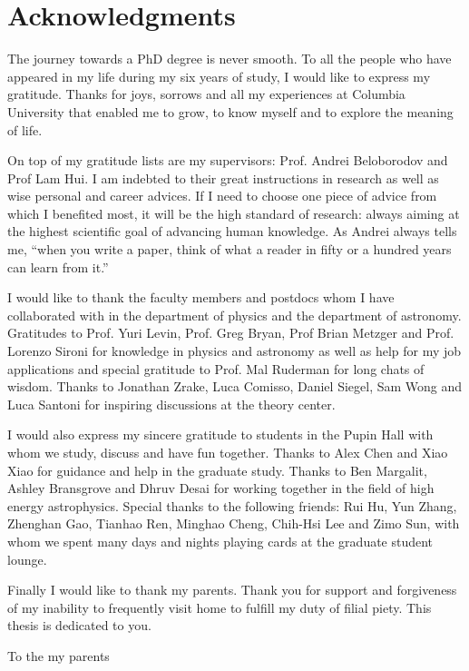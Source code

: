 \chapter*{Acknowledgments}
\label{chap:acknowledgments}

The journey towards a PhD degree is never smooth.
To all the people who have appeared in my life during my six years of study, I would like to express my gratitude.
Thanks for joys, sorrows and all my experiences at Columbia University that enabled me to grow, to know myself and to explore the meaning of life.

On top of my gratitude lists are my supervisors: Prof. Andrei Beloborodov and Prof Lam Hui.
I am indebted to their great instructions in research as well as wise personal and career advices. 
If I need to choose one piece of advice from which I benefited most, it will be the high standard of research: always aiming at the highest scientific goal of advancing human knowledge.
As Andrei always tells me, ``when you write a paper, think of what a reader in fifty or a hundred years can learn from it.''

I would like to thank the faculty members and postdocs whom I have collaborated with in the department of physics and the department of astronomy.
Gratitudes to Prof. Yuri Levin, Prof. Greg Bryan, Prof Brian Metzger and Prof. Lorenzo Sironi for knowledge in physics and astronomy as well as help for my job applications and special gratitude to Prof. Mal Ruderman for long chats of wisdom.
Thanks to Jonathan Zrake, Luca Comisso, Daniel Siegel, Sam Wong and Luca Santoni for inspiring discussions at the theory center.

I would also express my sincere gratitude to students in the Pupin Hall with whom we study, discuss and have fun together.
Thanks to Alex Chen and Xiao Xiao for guidance and help in the graduate study.
Thanks to Ben Margalit, Ashley Bransgrove and Dhruv Desai for working together in the field of high energy astrophysics.
Special thanks to the following friends: Rui Hu, Yun Zhang, Zhenghan Gao, Tianhao Ren, Minghao Cheng, Chih-Hsi Lee and Zimo Sun, with whom we spent many days and nights playing cards at the graduate student lounge.

Finally I would like to thank my parents. Thank you for support and forgiveness of my inability to frequently visit home to fulfill my duty of filial piety. This thesis is dedicated to you.

\newpage \vspace*{8cm}
\begin{center}
\large To the my parents %
\end{center}
